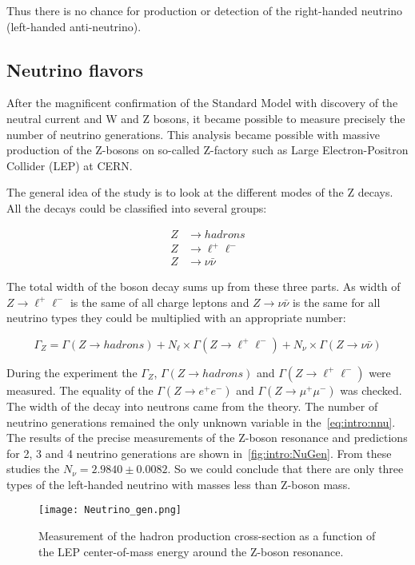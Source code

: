 \documentclass[../main.tex]{subfiles}
\begin{document}
Thus there is no chance for production or detection of the right-handed neutrino (left-handed anti-neutrino).

\subsection{Neutrino flavors}
After the magnificent confirmation of the Standard Model with discovery of the neutral current and W and Z bosons, it became possible to measure precisely the number of neutrino generations. This analysis became possible with massive production of the Z-bosons on so-called Z-factory such as Large Electron-Positron Collider (LEP) at CERN.

The general idea of the study is to look at the different modes of the Z decays. All the decays could be classified into several groups:

\begin{align}
Z&\to hadrons \nonumber \\
Z&\to \ell^+\ell^- \\
Z&\to \nu\bar{\nu} \nonumber
\end{align}

The total width of the boson decay sums up from these three parts. As width of $Z\to \ell^+\ell^-$ is the same of all charge leptons and $Z\to \nu\bar{\nu}$ is the same for all neutrino types they could be multiplied with an appropriate number:

\begin{equation}
\Gamma_Z=\Gamma(Z\to hadrons)+N_{\ell}\times\Gamma(Z\to \ell^+\ell^-) + N_{\nu}\times\Gamma(Z\to \nu\bar{\nu})
\label{eq:intro:nnu}
\end{equation}

During the experiment the $\Gamma_Z$, $\Gamma(Z\to hadrons)$ and $\Gamma(Z\to \ell^+\ell^-)$ were measured. The equality of the $\Gamma(Z\to e^+e^-)$ and $\Gamma(Z\to \mu^+\mu^-)$ was checked. The width of the decay into neutrons came from the theory. The number of neutrino generations remained the only unknown variable in the~\autoref{eq:intro:nnu}. The results of the precise measurements of the Z-boson resonance and predictions for 2, 3 and 4 neutrino generations are shown in~\autoref{fig:intro:NuGen}. From these studies the $N_{\nu}=2.9840\pm0.0082$. So we could conclude that there are only three types of the left-handed neutrino with masses less than Z-boson mass.

\begin{figure}[!ht]
    \centering
    \texttt{[image: Neutrino\_gen.png]}
    \caption{Measurement of the hadron production cross-section as a function of the LEP center-of-mass energy around the Z-boson resonance.}
    \label{fig:intro:NuGen}
\end{figure}
\end{document}

